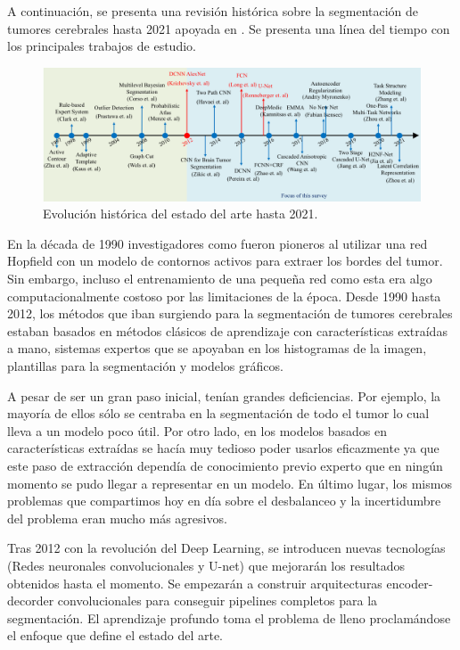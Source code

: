 	A continuación, se presenta una revisión histórica sobre la segmentación de tumores cerebrales hasta 2021 apoyada en \cite{liu2023deep}. Se presenta una línea del tiempo con los principales trabajos de estudio.
	
	\begin{figure}[H]
		\centering
		\includegraphics[width=1.0\linewidth]{imagenes/evolution_stateofart.png}
		\caption{Evolución histórica del estado del arte hasta 2021.}
	\end{figure}
	
	En la década de 1990 investigadores como \cite{zhu1997computerized} fueron pioneros al utilizar una red Hopfield con un modelo de contornos activos para extraer los bordes del tumor. Sin embargo, incluso el entrenamiento de una pequeña red como esta era algo computacionalmente costoso por las limitaciones de la época.  Desde 1990 hasta 2012, los métodos que iban surgiendo para la segmentación de tumores cerebrales estaban basados en métodos clásicos de aprendizaje con características extraídas a mano, sistemas expertos que se apoyaban en los histogramas de la imagen, plantillas para la segmentación y modelos gráficos. 
	
	A pesar de ser un gran paso inicial, tenían grandes deficiencias. Por ejemplo, la mayoría de ellos sólo se centraba en la segmentación de todo el tumor lo cual lleva a un modelo poco útil. Por otro lado, en los modelos basados en características extraídas se hacía muy tedioso poder usarlos eficazmente ya que este paso de extracción dependía de conocimiento previo experto que en ningún momento se pudo llegar a representar en un modelo. En último lugar, los mismos problemas que compartimos hoy en día sobre el desbalanceo y la incertidumbre del problema eran mucho más agresivos. 
	
	Tras 2012 con la revolución del Deep Learning, se introducen nuevas tecnologías (Redes neuronales convolucionales y U-net) que mejorarán los resultados obtenidos hasta el momento. 
	Se empezarán a construir arquitecturas encoder-decorder convolucionales para conseguir pipelines completos para la segmentación. El aprendizaje profundo toma el problema de lleno proclamándose el enfoque que define el estado del arte.
	
